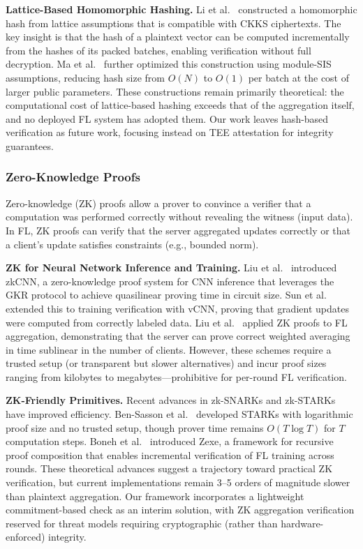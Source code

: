 \textbf{Lattice-Based Homomorphic Hashing.} Li et al.~\cite{li2022blockchain} constructed a homomorphic hash from lattice assumptions that is compatible with CKKS ciphertexts. The key insight is that the hash of a plaintext vector can be computed incrementally from the hashes of its packed batches, enabling verification without full decryption. Ma et al.~\cite{ma2021privacy} further optimized this construction using module-SIS assumptions, reducing hash size from $O(N)$ to $O(1)$ per batch at the cost of larger public parameters. These constructions remain primarily theoretical: the computational cost of lattice-based hashing exceeds that of the aggregation itself, and no deployed FL system has adopted them. Our work leaves hash-based verification as future work, focusing instead on TEE attestation for integrity guarantees.

\subsubsection{Zero-Knowledge Proofs}
\label{subsubsec:zk-proofs}

Zero-knowledge (ZK) proofs allow a prover to convince a verifier that a computation was performed correctly without revealing the witness (input data). In FL, ZK proofs can verify that the server aggregated updates correctly or that a client's update satisfies constraints (e.g., bounded norm).

\textbf{ZK for Neural Network Inference and Training.} Liu et al.~\cite{liu2021zkcnn} introduced zkCNN, a zero-knowledge proof system for CNN inference that leverages the GKR protocol to achieve quasilinear proving time in circuit size. Sun et al.~\cite{sun2023vcnn} extended this to training verification with vCNN, proving that gradient updates were computed from correctly labeled data. Liu et al.~\cite{liu2021verifiable} applied ZK proofs to FL aggregation, demonstrating that the server can prove correct weighted averaging in time sublinear in the number of clients. However, these schemes require a trusted setup (or transparent but slower alternatives) and incur proof sizes ranging from kilobytes to megabytes---prohibitive for per-round FL verification.

\textbf{ZK-Friendly Primitives.} Recent advances in zk-SNARKs and zk-STARKs have improved efficiency. Ben-Sasson et al.~\cite{bensasson2018scalable} developed STARKs with logarithmic proof size and no trusted setup, though prover time remains $O(T \log T)$ for $T$ computation steps. Boneh et al.~\cite{boneh2020zexe} introduced Zexe, a framework for recursive proof composition that enables incremental verification of FL training across rounds. These theoretical advances suggest a trajectory toward practical ZK verification, but current implementations remain 3--5 orders of magnitude slower than plaintext aggregation. Our framework incorporates a lightweight commitment-based check as an interim solution, with ZK aggregation verification reserved for threat models requiring cryptographic (rather than hardware-enforced) integrity.


